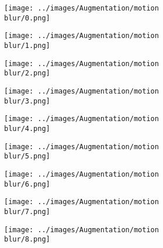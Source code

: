 \begin{figure}[H]
  \centering
 \captionsetup[subfigure]{labelformat=empty}
  \begin{subfigure}[b]{0.1\textwidth}
      \centering
      \texttt{[image: ../images/Augmentation/motion blur/0.png]}
  \end{subfigure}
  \hspace{1em}%
  \begin{subfigure}[b]{0.1\textwidth}
      \centering
      \texttt{[image: ../images/Augmentation/motion blur/1.png]}
  \end{subfigure}
  \hspace{1em}%
  \begin{subfigure}[b]{0.1\textwidth}
      \centering
      \texttt{[image: ../images/Augmentation/motion blur/2.png]}
  \end{subfigure}
  \hspace{1em}%
  \begin{subfigure}[b]{0.1\textwidth}
   \centering
   \texttt{[image: ../images/Augmentation/motion blur/3.png]}
 \end{subfigure}
 \hspace{1em}%
 \begin{subfigure}[b]{0.1\textwidth}
   \centering
   \texttt{[image: ../images/Augmentation/motion blur/4.png]}
 \end{subfigure}
 \hspace{1em}%
 \begin{subfigure}[b]{0.1\textwidth}
   \centering
   \texttt{[image: ../images/Augmentation/motion blur/5.png]}
 \end{subfigure}
 \hspace{1em}%
 \begin{subfigure}[b]{0.1\textwidth}
   \centering
   \texttt{[image: ../images/Augmentation/motion blur/6.png]}
 \end{subfigure}
 \hspace{1em}%
 \begin{subfigure}[b]{0.1\textwidth}
  \centering
  \texttt{[image: ../images/Augmentation/motion blur/7.png]}
\end{subfigure}
\hspace{1em}%
 \begin{subfigure}[b]{0.1\textwidth}
 \centering
 \texttt{[image: ../images/Augmentation/motion blur/8.png]}

\end{subfigure}
\end{figure}
